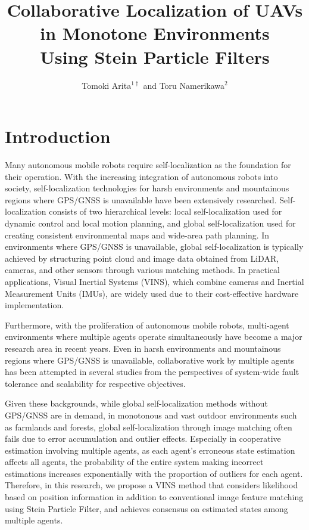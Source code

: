 \documentclass[a4paper,fleqn,10pt,twocolumn]{SICE_ISCS}
\title{Collaborative Localization of UAVs in Monotone Environments\\
	 Using Stein Particle Filters}
\author{Tomoki Arita${}^{1\dagger}$ and Toru Namerikawa${}^{2}$}
\begin{document}
\maketitle


\section{Introduction}
Many autonomous mobile robots require self-localization as the foundation for their operation. With the increasing integration of autonomous robots into society, self-localization technologies for harsh environments and mountainous regions where GPS/GNSS is unavailable have been extensively researched. Self-localization consists of two hierarchical levels: local self-localization used for dynamic control and local motion planning, and global self-localization used for creating consistent environmental maps and wide-area path planning. In environments where GPS/GNSS is unavailable, global self-localization is typically achieved by structuring point cloud and image data obtained from LiDAR, cameras, and other sensors through various matching methods. In practical applications, Visual Inertial Systems (VINS), which combine cameras and Inertial Measurement Units (IMUs), are widely used due to their cost-effective hardware implementation\cite{VINS-Mono}.

Furthermore, with the proliferation of autonomous mobile robots, multi-agent environments where multiple agents operate simultaneously have become a major research area in recent years. Even in harsh environments and mountainous regions where GPS/GNSS is unavailable, collaborative work by multiple agents has been attempted in several studies from the perspectives of system-wide fault tolerance and scalability for respective objectives\cite{Multi-Robot-SLAM,Swarm-Robots}.

Given these backgrounds, while global self-localization methods without GPS/GNSS are in demand, in monotonous and vast outdoor environments such as farmlands and forests, global self-localization through image matching often fails due to error accumulation and outlier effects. Especially in cooperative estimation involving multiple agents, as each agent's erroneous state estimation affects all agents, the probability of the entire system making incorrect estimations increases exponentially with the proportion of outliers for each agent. Therefore, in this research, we propose a VINS method that considers likelihood based on position information in addition to conventional image feature matching using Stein Particle Filter, and achieves consensus on estimated states among multiple agents.
\end{document}
